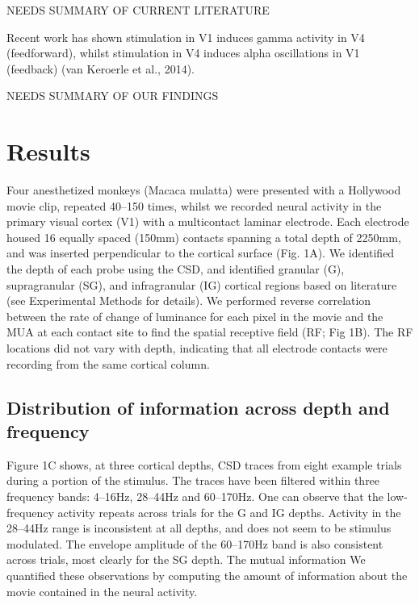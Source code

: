 \documentclass{article}
\begin{document}
NEEDS SUMMARY OF CURRENT LITERATURE

Recent work has shown stimulation in V1 induces gamma activity in V4 (feedforward), whilst stimulation in V4 induces alpha oscillations in V1 (feedback) (van Keroerle et al., 2014).

NEEDS SUMMARY OF OUR FINDINGS

\section{Results}
Four anesthetized monkeys (Macaca mulatta) were presented with a Hollywood movie clip, repeated 40--150 times, whilst we recorded neural activity in the primary visual cortex (V1) with a multicontact laminar electrode. Each electrode housed 16 equally spaced (150\hspace{0.2em}\textgreek{m}m) contacts spanning a total depth of 2250\hspace{0.2em}\textgreek{m}m, and was inserted perpendicular to the cortical surface (Fig. 1A). We identified the depth of each probe using the CSD, and identified granular (G), supragranular (SG), and infragranular (IG) cortical regions based on literature (see Experimental Methods for details). We performed reverse correlation between the rate of change of luminance for each pixel in the movie and the MUA at each contact site to find the spatial receptive field (RF; Fig 1B). The RF locations did not vary with depth, indicating that all electrode contacts were recording from the same cortical column.

\subsection[Distribution of information across depth and frequency]{Distribution of information across depth and frequency}
Figure 1C shows, at three cortical depths, CSD traces from eight example trials during a portion of the stimulus. The traces have been filtered within three frequency bands: 4--16Hz, 28--44Hz and 60--170Hz. One can observe that the low-frequency activity repeats across trials for the G and IG depths. Activity in the 28--44Hz range is inconsistent at all depths, and does not seem to be stimulus modulated. The envelope amplitude of the 60--170Hz band is also consistent across trials, most clearly for the SG depth. The mutual information We quantified these observations by computing the amount of information about the movie contained in the neural activity.
\end{document}
